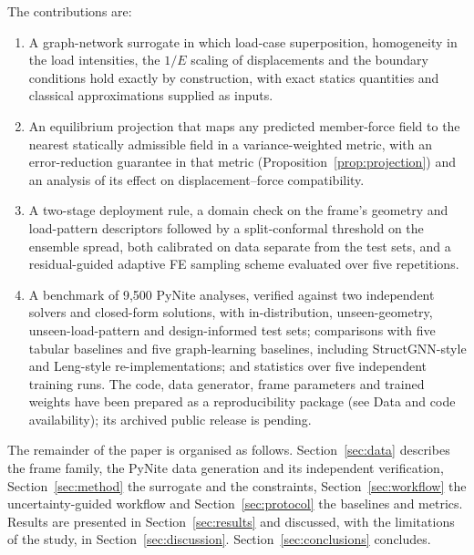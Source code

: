 The contributions are:
\begin{enumerate}
\item A graph-network surrogate in which load-case superposition, homogeneity in the load intensities, the $1/E$ scaling of displacements and the boundary conditions hold exactly by construction, with exact statics quantities and classical approximations supplied as inputs.
\item An equilibrium projection that maps any predicted member-force field to the nearest statically admissible field in a variance-weighted metric, with an error-reduction guarantee in that metric (Proposition~\ref{prop:projection}) and an analysis of its effect on displacement--force compatibility.
\item A two-stage deployment rule, a domain check on the frame's geometry and load-pattern descriptors followed by a split-conformal threshold on the ensemble spread, both calibrated on data separate from the test sets, and a residual-guided adaptive FE sampling scheme evaluated over five repetitions.
\item A benchmark of 9{,}500 PyNite analyses, verified against two independent solvers and closed-form solutions, with in-distribution, unseen-geometry, unseen-load-pattern and design-informed test sets; comparisons with five tabular baselines and five graph-learning baselines, including StructGNN-style and Leng-style re-implementations; and statistics over five independent training runs. The code, data generator, frame parameters and trained weights have been prepared as a reproducibility package (see Data and code availability); its archived public release is pending.
\end{enumerate}

The remainder of the paper is organised as follows. Section~\ref{sec:data} describes the frame family, the PyNite data generation and its independent verification, Section~\ref{sec:method} the surrogate and the constraints, Section~\ref{sec:workflow} the uncertainty-guided workflow and Section~\ref{sec:protocol} the baselines and metrics. Results are presented in Section~\ref{sec:results} and discussed, with the limitations of the study, in Section~\ref{sec:discussion}. Section~\ref{sec:conclusions} concludes.

